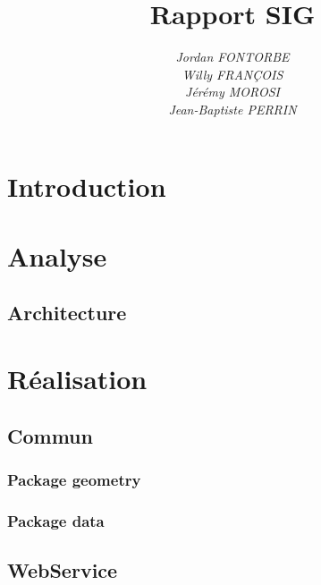 \documentclass{beamer}
\begin{document}
\title{}
\title{\textbf{Rapport SIG}}
\author{
	\textit{Jordan FONTORBE}\\
	\textit{Willy FRANÇOIS}\\
	\textit{Jérémy MOROSI}\\
	\textit{Jean-Baptiste PERRIN}
}
\maketitle

\tableofcontents

\section{Introduction}
\begin{frame}
\end{frame}


\section{Analyse}
\subsection{Architecture}
\begin{frame}
\end{frame}


\section{Réalisation}

\subsection{Commun}
\subsubsection{Package geometry}
\begin{frame}
\end{frame}
\subsubsection{Package data}
\begin{frame}
\end{frame}

\subsection{WebService}
\begin{frame}
\end{frame}
\end{document}
